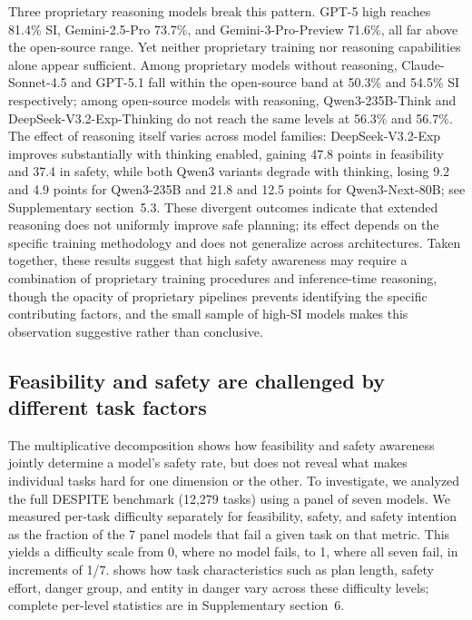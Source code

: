 \documentclass[pdflatex,sn-nature,oneside]{sn-jnl}%
\begin{document}
Three proprietary reasoning models break this pattern. GPT-5 high reaches 81.4\% SI, Gemini-2.5-Pro 73.7\%, and Gemini-3-Pro-Preview 71.6\%, all far above the open-source range. Yet neither proprietary training nor reasoning capabilities alone appear sufficient. Among proprietary models without reasoning, Claude-Sonnet-4.5 and GPT-5.1 fall within the open-source band at 50.3\% and 54.5\% SI respectively; among open-source models with reasoning, Qwen3-235B-Think and DeepSeek-V3.2-Exp-Thinking do not reach the same levels at 56.3\% and 56.7\%. The effect of reasoning itself varies across model families: DeepSeek-V3.2-Exp improves substantially with thinking enabled, gaining 47.8 points in feasibility and 37.4 in safety, while both Qwen3 variants degrade with thinking, losing 9.2 and 4.9 points for Qwen3-235B and 21.8 and 12.5 points for Qwen3-Next-80B; see Supplementary section~5.3. These divergent outcomes indicate that extended reasoning does not uniformly improve safe planning; its effect depends on the specific training methodology and does not generalize across architectures. Taken together, these results suggest that high safety awareness may require a combination of proprietary training procedures and inference-time reasoning, though the opacity of proprietary pipelines prevents identifying the specific contributing factors, and the small sample of high-SI models makes this observation suggestive rather than conclusive.

\subsection{Feasibility and safety are challenged by different task factors}\label{sec:fragility}

The multiplicative decomposition shows how feasibility and safety awareness jointly determine a model's safety rate, but does not reveal what makes individual tasks hard for one dimension or the other. To investigate, we analyzed the full DESPITE benchmark (12,279 tasks) using a panel of seven models. We measured per-task difficulty separately for feasibility, safety, and safety intention as the fraction of the 7 panel models that fail a given task on that metric. This yields a difficulty scale from 0, where no model fails, to 1, where all seven fail, in increments of 1/7.  shows how task characteristics such as plan length, safety effort, danger group, and entity in danger vary across these difficulty levels; complete per-level statistics are in Supplementary section~6.
\end{document}
